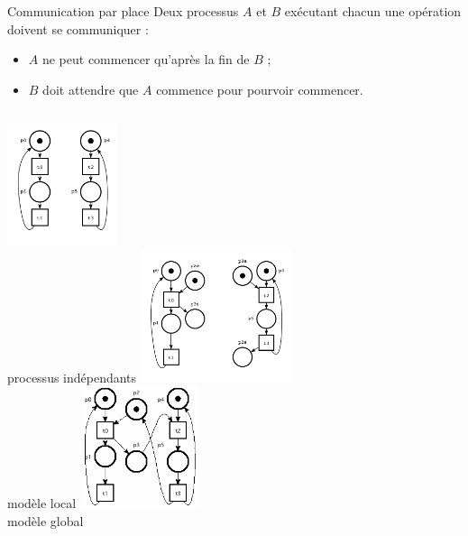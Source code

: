 \documentclass[compress]{beamer}
\begin{document}
\begin{frame}{Communication par place}
Deux processus $A$ et $B$ exécutant chacun une opération doivent se communiquer :
\begin{itemize}
\item $A$ ne peut commencer qu'après la fin de $B$ ;
\item $B$ doit attendre que $A$ commence pour pourvoir commencer.
\end{itemize}
\begin{columns}
	\includegraphics[width=3.2cm]{comp2Seul_ndr}\\
	processus indépendants \pause
{}
	\includegraphics[width=4.4cm]{compSep_ndr} \\
	modèle local\pause
{}
	\includegraphics[width=3.5cm]{comp3_ndr}\\
	modèle global
\end{columns}
\end{frame}
\end{document}
